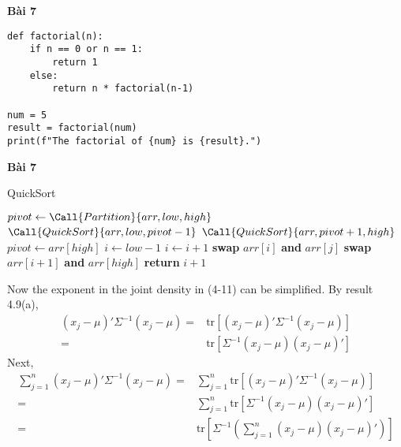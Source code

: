 \documentclass[11pt]{article}
\begin{document}
\textbf{Bài 7}
\lstset{style = mystyle}
\begin{lstlisting}[caption={Mã nguồn Python}, label={lst:python-code}]
def factorial(n):
    if n == 0 or n == 1:
        return 1
    else:
        return n * factorial(n-1)

num = 5
result = factorial(num)
print(f"The factorial of {num} is {result}.")
\end{lstlisting}
\textbf{Bài 7}
\begin{algorithm}
\caption{QuickSort}
\label{alg:quicksort}
\begin{algorithmic}[1]
        \State $pivot \gets \Call{Partition}{arr, low, high}$
        \State $\Call{QuickSort}{arr, low, pivot - 1}$
        \State $\Call{QuickSort}{arr, pivot + 1, high}$
    \EndIf
\EndProcedure
\Statex
{}
    \State $pivot \gets arr[high]$
    \State $i \gets low - 1$
            \State $i \gets i + 1$
            \State \textbf{swap} $arr[i]$ \textbf{and} $arr[j]$
        \EndIf
    \EndFor
    \State \textbf{swap} $arr[i + 1]$ \textbf{and} $arr[high]$
    \State \textbf{return} $i + 1$
\EndProcedure
\end{algorithmic}
\end{algorithm}

\newpage
Now the exponent in the joint density in (4-11) can be simplified. By result 4.9(a),\\
\begin{align*}
    (x_j- \mu )'  \Sigma^{-1} (x_j-\mu)
    =&\text{tr}[(x_j-\mu)'\Sigma^{-1}(x_j-\mu)]\\
    =&\text{tr}[\Sigma^{-1}(x_j-\mu)(x_j-\mu)']
    \tag{4-12}
\end{align*}
Next,
\begin{align*}
     \sum_{j=1}^{n}(x_j-\mu)'\Sigma^{-1}(x_j-\mu)
 =&\sum_{j=1}^{n}\text{tr}[(x_j-\mu)'\Sigma^{-1}(x_j-\mu)]\\
 =&\sum_{j=1}^{n}\text{tr}[\Sigma^{-1}(x_j-\mu)(x_j-\mu)']\\
 =&\text{tr}\left[\Sigma^{-1}\left(\sum_{j=1}^{n}(x_j-\mu)(x_j-\mu)'\right)\right]
  \tag{4-13}
\end{align*}
\end{document}
